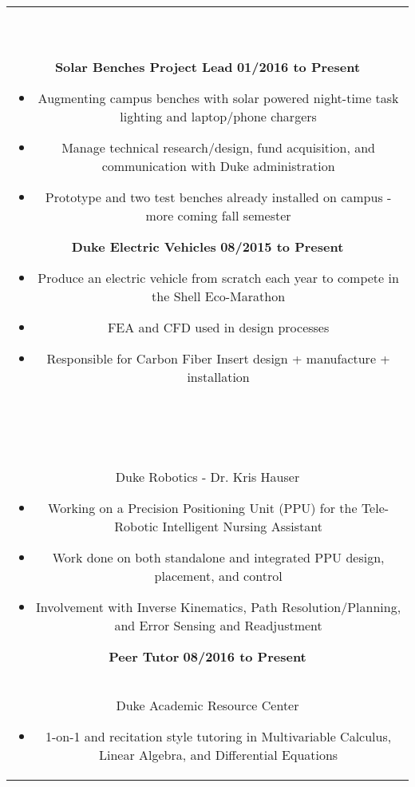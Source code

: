 \documentclass[11pt]{amsart}
\newcommand*\ruleline[1]{\par\noindent\raisebox{.8ex}{\makebox[\linewidth]{\hrulefill\hspace{1ex}\raisebox{-.8ex}{\Large~#1~}\hspace{1ex}\hrulefill}}\\ \-\ \vspace{-1em}}
\begin{document}
\begin{center}
\begin{tabular}{c}
	\ruleline{Activities}
	\begin{minipage}{\textwidth}
		{\bf Solar Benches Project Lead} \hfill {\bf 01/2016 to Present}
		\begin{itemize}
			\item Augmenting campus benches with solar powered night-time task lighting and laptop/phone chargers
			\item Manage technical research/design, fund acquisition, and communication with Duke administration
			\item Prototype and two test benches already installed on campus - more coming fall semester
		\end{itemize}
		{\bf Duke Electric Vehicles} \hfill {\bf 08/2015 to Present}
		\begin{itemize}
			\item Produce an electric vehicle from scratch each year to compete in the Shell Eco-Marathon
			\item FEA and CFD used in design processes
			\item Responsible for Carbon Fiber Insert design + manufacture + installation
		\end{itemize}
	\end{minipage}\\~\\
	
	\ruleline{Work History}
	\begin{minipage}{\textwidth}
		{\bf Robotics NSF REU Internship} \hfill {\bf 05/2017 to Present}\\
		{Duke Robotics - Dr. Kris Hauser}
		\begin{itemize}
			\item Working on a Precision Positioning Unit (PPU) for the Tele-Robotic Intelligent Nursing Assistant
			\item Work done on both standalone and integrated PPU design, placement, and control
			\item Involvement with Inverse Kinematics, Path Resolution/Planning, and Error Sensing and Readjustment
		\end{itemize}
		
		{\bf Peer Tutor} \hfill {\bf 08/2016 to Present}\\
		{Duke Academic Resource Center}
		\begin{itemize}
			\item 1-on-1 and recitation style tutoring in Multivariable Calculus, Linear Algebra, and Differential Equations
		\end{itemize}
		

\end{minipage}
\end{tabular}
\end{center}
\end{document}

